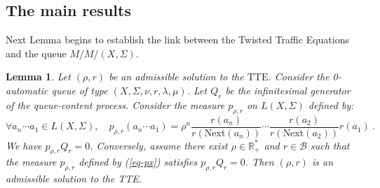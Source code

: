 \documentclass[11pt,a4paper]{article}
\newtheorem{lemma}[theorem]{Lemma}
\theoremstyle{remark}
\def\Blackboardfont{\mathbb}
\def\rig{\text{Next}}
\def\cb{\cB}
\def\R{{\Blackboardfont R}}
\def\cB{{\mathcal B}}
\def\eref#1{(\ref{#1})}
\begin{document}
\subsection{The main results}\label{sse-main}

Next Lemma begins
to establish the link between the
Twisted Traffic Equations and the queue $M/M/(X,\Sigma)$.

\begin{lemma}\label{lemma2}
Let $(\rho,r)$ be an admissible solution to the
$\text{TTE}$. Consider the 0-automatic queue of type
$(X,\Sigma,\nu,r,\lambda,\mu)$. Let $Q_r$ be the infinitesimal generator
of the queue-content process.
Consider the measure $p_{\rho,r}$ on $L(X,\Sigma)$ defined by:
\begin{equation}\label{eq-px}
\forall a_n\cdots a_1\in L(X,\Sigma), \quad p_{\rho,r}(a_n\cdots
a_1) = \rho^n \frac{r(a_n)}{r(\rig(a_n))}\cdots
\frac{r(a_{2})}{r(\rig(a_{2}))}
    r(a_1) \:.
\end{equation}
We have $p_{\rho,r} Q_r=0$. Conversely, assume there exist
$\rho\in \R_+^*$ and $r\in \cb$ such that the measure $p_{\rho,r}$
defined by \eref{eq-px} satisfies $p_{\rho,r} Q_r=0$. Then
$(\rho,r)$ is an admissible solution to the TTE.
\end{lemma}
\end{document}
